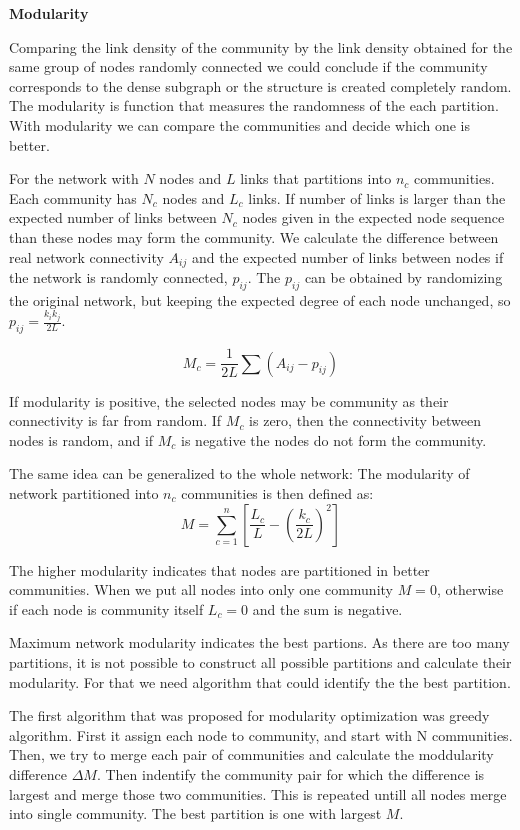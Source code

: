 \textbf{Modularity}

Comparing the link density of the community by the link density obtained for the same group of nodes randomly connected we could conclude if the community corresponds to the dense subgraph or the structure is created completely random. The modularity is function that measures the randomness of the each partition. With modularity we can compare the communities and decide which one is better. 

For the network with $N$ nodes and $L$ links that partitions into $n_c$ communities. Each community has $N_c$ nodes and $L_c$ links. If number of links is larger than the expected number of links between $N_c$ nodes given in the expected node sequence than these nodes may form the community. We calculate the difference between real network connectivity $A_{ij}$ and the expected number of links between nodes if the network is randomly connected, $p_{ij}$. The $p_{ij}$ can be obtained by randomizing the original network, but keeping the expected degree of each node unchanged, so $p_{ij}= \frac{k_ik_j}{2L}$.

\begin{equation}
M_c = \frac{1}{2L}\sum(A_{ij}-p_{ij})
\end{equation}

If modularity is positive, the selected nodes may be community as their connectivity is far from random. If $M_c$ is zero, then the connectivity between nodes is random, and if $M_c$ is negative the nodes do not form the community. 

The same idea can be generalized to the whole network: The modularity of network partitioned into $n_c$ communities is then defined as:
\begin{equation}
M=\sum_{c=1}^{n} [\frac{L_c}{L} - (\frac{k_c}{2L})^2]
\end{equation}

The higher modularity indicates that nodes are partitioned in better communities. When we put all nodes into only one community $M=0$, otherwise if each node is community itself $L_c=0$ and the sum is negative. 

Maximum network modularity indicates the best partions. As there are too many partitions, it is not possible to construct all possible partitions and calculate their modularity. For that we need algorithm that could identify the the best partition. 

The first algorithm that was proposed for modularity optimization was greedy algorithm. First it assign each node to community, and start with N communities. Then, we try to merge each pair of communities and calculate the moddularity difference $\Delta M$. Then indentify the community pair for which the difference is largest and merge those two communities. This is repeated untill all nodes merge into single community. The best partition is one with largest $M$. 

